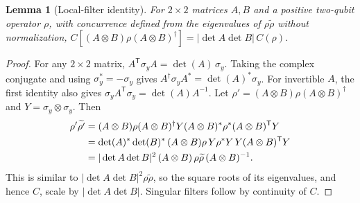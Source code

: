 \documentclass[11pt,a4paper]{article}
\newtheorem{lemma}[proposition]{Lemma}
\begin{document}
\begin{lemma}[Local-filter identity]\label{lem:filter}
For $2\times2$ matrices $A,B$ and a positive two-qubit operator $\rho$,
with concurrence defined from the eigenvalues of $\rho\widetilde\rho$
without normalization,
$C[(A\otimes B)\rho(A\otimes B)^\dagger]=|\det A\det B|\,C(\rho)$.
\end{lemma}
\begin{proof}
For any $2\times2$ matrix, $A^{\mathsf T}\sigma_yA=\det(A)\,\sigma_y$.
Taking the complex conjugate and using $\sigma_y^*=-\sigma_y$ gives
$A^\dagger\sigma_yA^*=\det(A)^*\sigma_y$. For invertible $A$, the first
identity also gives $\sigma_yA^{\mathsf T}\sigma_y=\det(A)A^{-1}$. Let
$\rho'=(A\otimes B)\rho(A\otimes B)^\dagger$ and $Y=\sigma_y\otimes\sigma_y$.
Then
\begin{align}
 \rho'\widetilde{\rho'}
 &=(A\otimes B)\rho(A\otimes B)^\dagger Y(A\otimes B)^*\rho^*(A\otimes B)^{\mathsf T}Y\notag\\
 &=\det(A)^*\det(B)^*\,(A\otimes B)\rho\,Y\rho^*Y\,Y(A\otimes B)^{\mathsf T}Y\notag\\
 &=|\det A\det B|^2\,(A\otimes B)\,\rho\widetilde\rho\,(A\otimes B)^{-1}.
\end{align}
This is similar to $|\det A\det B|^2\rho\widetilde\rho$, so the square
roots of its eigenvalues, and hence $C$, scale by $|\det A\det B|$.
Singular filters follow by continuity of $C$.
\end{proof}
\end{document}
